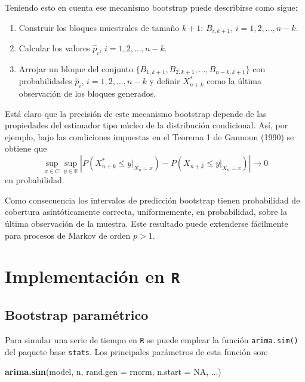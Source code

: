 \documentclass[
]{book}
\newenvironment{Shaded}{\begin{snugshade}}{\end{snugshade}}
\newcommand{\AttributeTok}[1]{\textcolor[rgb]{0.13,0.29,0.53}{#1}}
\newcommand{\ConstantTok}[1]{\textcolor[rgb]{0.56,0.35,0.01}{#1}}
\newcommand{\FunctionTok}[1]{\textcolor[rgb]{0.13,0.29,0.53}{\textbf{#1}}}
\newcommand{\NormalTok}[1]{#1}
\theoremstyle{break}
\theoremstyle{nonumberplain}
\begin{document}
Teniendo esto en cuenta ese mecanismo bootstrap puede describirse como
sigue:

\begin{enumerate}
\def\labelenumi{\arabic{enumi}.}
\item
  Construir los bloques muestrales de tamaño \(k+1\): \(B_{i,k+1}\),
  \(i=1,2,\ldots ,n-k\).
\item
  Calcular los valores \(\widehat{p}_i\), \(i=1,2,\ldots ,n-k\).
\item
  Arrojar un bloque del conjunto \(\{B_{1,k+1},B_{2,k+1},\ldots
  ,B_{n-k,k+1}\}\) con probabilidades \(\widehat{p}_i\),
  \(i=1,2,\ldots ,n-k\) y definir \(X_{n+k}^{\ast}\) como la última
  observación de los bloques generados.
\end{enumerate}

Está claro que la precisión de este mecanismo bootstrap depende de las
propiedades del estimador tipo núcleo de la distribución condicional.
Así, por ejemplo, bajo las condiciones impuestas en el Teorema 1 de
Gannoun (1990) se obtiene que
\[\sup_{x\in C}\sup_{y\in \mathbb{R}}\left\vert P\left( X_{n+k}^{\ast}\leq
y|_{X_n=x} \right) -P\left( X_{n+k}\leq y|_{X_n=x} \right) \right\vert
\rightarrow 0\]
en probabilidad.

Como consecuencia los intervalos de predicción bootstrap tienen
probabilidad de cobertura asintóticamente correcta, uniformemente, en
probabilidad, sobre la última observación de la muestra. Este resultado
puede extenderse fácilmente para procesos de Markov de orden
\(p>1\).

\section{\texorpdfstring{Implementación en \texttt{R}}{Implementación en R}}\label{implementaciuxf3n-en-r}

\subsection{Bootstrap paramétrico}\label{bootstrap-paramuxe9trico}

Para simular una serie de tiempo en \texttt{R} se puede emplear la función
\texttt{arima.sim()} del paquete base \texttt{stats}.
Los principales parámetros de esta función son:

\begin{Shaded}
\begin{Highlighting}[]
\FunctionTok{arima.sim}\NormalTok{(model, n, }\AttributeTok{rand.gen =}\NormalTok{ rnorm, }\AttributeTok{n.start =} \ConstantTok{NA}\NormalTok{, ...)}
\end{Highlighting}
\end{Shaded}
\end{document}
